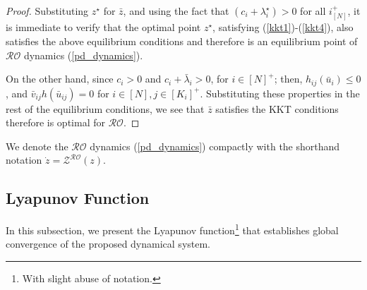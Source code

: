\documentclass[journal,twoside,web]{ieeecolor}
\begin{document}
\begin{proof}
Substituting $z^\star$ for $\bar{z}$, and using the fact that $(c_i+\lambda_i^\star)>0$ for all $i^+_{[N]}$, it is immediate to verify that the optimal point $z^\star$, satisfying (\ref{kkt1})-(\ref{kkt4}), also satisfies the above equilibrium conditions and therefore is an equilibrium point of $\mathcal{RO}$ dynamics (\ref{pd_dynamics}).

On the other hand, since $c_i> 0$ and $c_i+\bar{\lambda}_i>0$,  for $i\in[N]^+$; then, $h_{ij}(\bar{u}_i)\leq 0$, and $\bar{v}_{ij} h(\bar{u}_{ij})=0$ for $i\in[N],j\in[K_i]^+$. Substituting these properties in the rest of the equilibrium conditions, we see that $\bar{z}$ satisfies the KKT conditions therefore is optimal for $\mathcal{RO}$.

\end{proof}


We denote the $\mathcal{RO}$ dynamics (\ref{pd_dynamics}) compactly with the shorthand notation $\dot z=\mathcal{Z}^{\mathcal{RO}}(z)$.

\subsection{Lyapunov Function}
In this subsection, we present the Lyapunov function\footnote{With slight abuse of notation.} that establishes global convergence of the proposed dynamical system.
\end{document}
